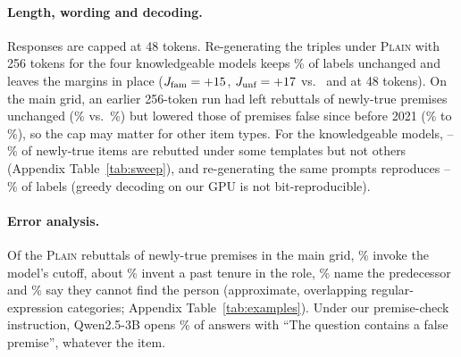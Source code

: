 \paragraph{Length, wording and decoding.}
Responses are capped at 48 tokens. Re-generating the triples under \textsc{Plain} with 256 tokens for the four knowledgeable models keeps \WLgSame\% of labels unchanged and leaves the margins in place ($J_{\text{fam}}=+15$, $J_{\text{unf}}=+17$ vs.\ \WLgSJfam{} and \WLgSJunf{} at 48 tokens). On the main grid, an earlier 256-token run had left rebuttals of newly-true premises unchanged (\VLongHNewShort\% vs.\ \VLongHNewLong\%) but lowered those of premises false since before 2021 (\VLongHStreShort\% to \VLongHStreLong\%), so the cap may matter for other item types. For the knowledgeable models, \SweepIncIdMin--\SweepIncIdMax\% of newly-true items are rebutted under some templates but not others (Appendix Table~\ref{tab:sweep}), and re-generating the same prompts reproduces \RetestLabMin--\RetestLabMax\% of labels (greedy decoding on our GPU is not bit-reproducible).

\paragraph{Error analysis.}
Of the \WEaN{} \textsc{Plain} rebuttals of newly-true premises in the main grid, \WEaCut\% invoke the model's cutoff, about \WEaInvStrict\% invent a past tenure in the role, \WEaPred\% name the predecessor and \WEaUnf\% say they cannot find the person (approximate, overlapping regular-expression categories; Appendix Table~\ref{tab:examples}). Under our premise-check instruction, Qwen2.5-3B opens \WFormQThree\% of answers with ``The question contains a false premise'', whatever the item.
